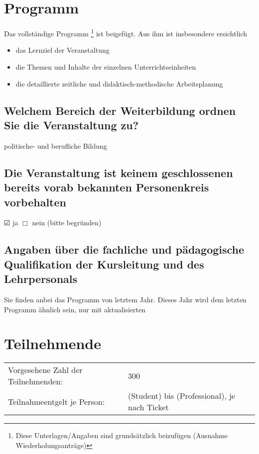 \documentclass{scrartcl}
\newcommand{\raisedrule}[2][0em]{\leaders\hbox{\rule[#1]{1pt}{#2}}\hfill}
\begin{document}
\section{Programm}
Das vollständige Programm%
\footnote{Diese Unterlagen/Angaben sind grundsätzlich beizufügen (Ausnahme Wiederholungsanträge)}
ist beigefügt. Aus ihm ist insbesondere ersichtlich
\begin{itemize}
\item das Lernziel der Veranstaltung
\item die Themen und Inhalte der einzelnen Unterrichtseinheiten
\item die detaillierte zeitliche und didaktisch-methodische Arbeitsplanung
\end{itemize}

\subsection{Welchem Bereich der Weiterbildung ordnen Sie die Veranstaltung zu?}

politische- und berufliche Bildung



\subsection{%
Die Veranstaltung ist keinem geschlossenen bereits vorab bekannten 
Personenkreis vorbehalten}

$\CheckedBox$ ja
\hspace{10em}
$\Box$ nein (bitte begründen)



\subsection{%
Angaben über die fachliche und pädagogische Qualifikation der Kursleitung und des
Lehrpersonals}


Sie finden anbei das Programm von letztem Jahr.
Dieses Jahr wird dem letzten Programm ähnlich sein, nur mit aktualisierten

\section{Teilnehmende}
\begin{tabu} to .95\textwidth {X X}
Vorgesehene Zahl der Teilnehmenden:     &  300  \\
Teilnahmeentgelt je Person:             &   (Student) bis  (Professional), je nach Ticket
\end{tabu}
\end{document}
